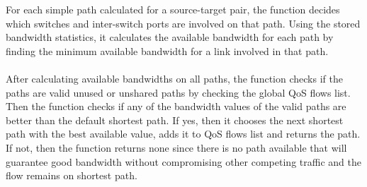 \documentclass[paper=a4, fontsize=12pt]{scrartcl}	%
\numberwithin{equation}{section}		%
\numberwithin{figure}{section}			%
\numberwithin{table}{section}				%
\begin{document}
For each simple path calculated for a source-target pair, the function decides which switches and inter-switch ports are involved on that path. Using the stored bandwidth statistics, it calculates the available bandwidth for each path by finding the minimum available bandwidth for a link involved in that path.
\\
\\
After calculating available bandwidths on all paths, the function checks if the paths are valid unused or unshared paths by checking the global QoS flows list. Then the function checks if any of the bandwidth values of the valid paths are better than the default shortest path. If yes, then it chooses the next shortest path with the best available value, adds it to QoS flows list and returns the path. If not, then the function returns none since there is no path available that will guarantee good bandwidth without compromising other competing traffic and the flow remains on shortest path.
\end{document}

